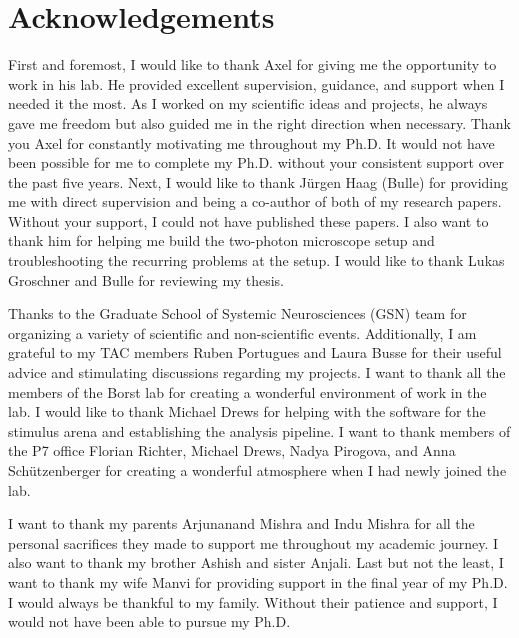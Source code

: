 
\begingroup
\let\clearpage\relax
\let\cleardoublepage\relax
\let\cleardoublepage\relax

\chapter*{Acknowledgements}

First and foremost, I would like to thank Axel for giving me the opportunity to work in his lab. He provided excellent supervision, guidance, and support when I needed it the most. As I worked on my scientific ideas and projects, he always gave me freedom but also guided me in the right direction when necessary. Thank you Axel for constantly motivating me throughout my Ph.D. It would not have been possible for me to complete my Ph.D. without your consistent support over the past five years. Next, I would like to thank Jürgen Haag (Bulle) for providing me with direct supervision and being a co-author of both of my research papers. Without your support, I could not have published these papers. I also want to thank him for helping me build the two-photon microscope setup and troubleshooting the recurring problems at the setup. I would like to thank Lukas Groschner and Bulle for reviewing my thesis. 

Thanks to the Graduate School of Systemic Neurosciences (GSN) team for organizing a variety of scientific and non-scientific events. Additionally, I am grateful to my TAC members Ruben Portugues and Laura Busse for their useful advice and stimulating discussions regarding my projects. I want to thank all the members of the Borst lab for creating a wonderful environment of work in the lab. I would like to thank Michael Drews for helping with the software for the stimulus arena and establishing the analysis pipeline. I want to thank members of the P7 office Florian Richter, Michael Drews, Nadya Pirogova, and Anna Schützenberger for creating a wonderful atmosphere when I had newly joined the lab. 

I want to thank my parents Arjunanand Mishra and Indu Mishra for all the personal sacrifices they made to support me throughout my academic journey. I also want to thank my brother Ashish and sister Anjali. Last but not the least, I want to thank my wife Manvi for providing support in the final year of my Ph.D. I would always be thankful to my family. Without their patience and support, I would not have been able to pursue my Ph.D.



